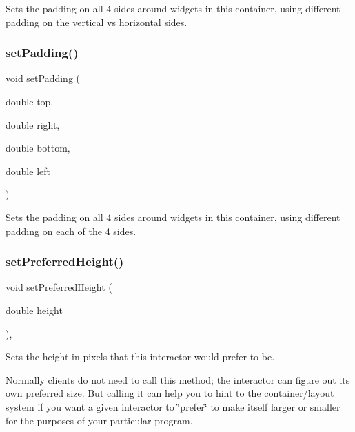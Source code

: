 Sets the padding on all 4 sides around widgets in this container, using different padding on the vertical vs horizontal sides. 

\mbox{\label{classGContainer_a9adbf36914b59c2ed3ed9aebe7adfc7e}} 
\subsubsection{\texorpdfstring{set\+Padding()}{setPadding()}\hspace{0.1cm}{\footnotesize\ttfamily [3/3]}}
{\footnotesize\ttfamily void set\+Padding (\begin{DoxyParamCaption}\item[{double}]{top,  }\item[{double}]{right,  }\item[{double}]{bottom,  }\item[{double}]{left }\end{DoxyParamCaption})\hspace{0.3cm}{\ttfamily [virtual]}}



Sets the padding on all 4 sides around widgets in this container, using different padding on each of the 4 sides. 

\mbox{\label{classGInteractor_a1ab987704fce32098706c6f00fb08218}} 
\subsubsection{\texorpdfstring{set\+Preferred\+Height()}{setPreferredHeight()}}
{\footnotesize\ttfamily void set\+Preferred\+Height (\begin{DoxyParamCaption}\item[{double}]{height }\end{DoxyParamCaption})\hspace{0.3cm}{\ttfamily [virtual]}, {\ttfamily [inherited]}}



Sets the height in pixels that this interactor would prefer to be. 

Normally clients do not need to call this method; the interactor can figure out its own preferred size. But calling it can help you to hint to the container/layout system if you want a given interactor to \char`\"{}prefer\char`\"{} to make itself larger or smaller for the purposes of your particular program. \mbox{\label{classGInteractor_a042c5ae19430d765ef552371cae3632c}} 
